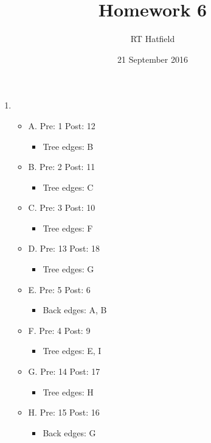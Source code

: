 \documentclass{article}
\title{Homework 6}
\author{RT Hatfield}
\date{21 September 2016}
\begin{document}
    \maketitle
    \begin{enumerate}
        \item \begin{itemize}
            \item A.  Pre: 1 Post: 12
            \begin{itemize}
                \item Tree edges: B
            \end{itemize}
            \item B. Pre: 2 Post: 11
            \begin{itemize}
                \item Tree edges: C
            \end{itemize}
            \item C. Pre: 3 Post: 10
            \begin{itemize}
                \item Tree edges: F
            \end{itemize}
            \item D. Pre: 13 Post: 18
            \begin{itemize}
                \item Tree edges: G
            \end{itemize}
            \item E. Pre: 5 Post: 6
            \begin{itemize}
                \item Back edges: A, B
            \end{itemize}
            \item F. Pre: 4 Post: 9
            \begin{itemize}
                \item Tree edges: E, I
            \end{itemize} 
            \item G. Pre: 14 Post: 17
            \begin{itemize}
                \item Tree edges: H
            \end{itemize}
            \item H. Pre: 15 Post: 16
            \begin{itemize}
                \item Back edges: G
            \end{itemize}

\end{itemize}
\end{enumerate}
\end{document}
